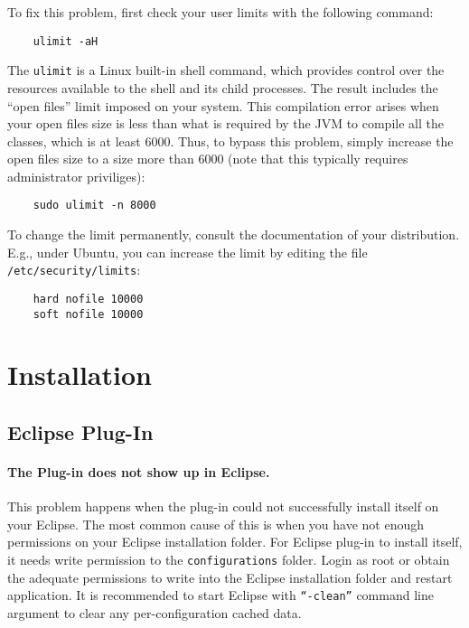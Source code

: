 \noindent To fix this problem, first check your user limits with the
following command:
\begin{verbatim}
    ulimit -aH
\end{verbatim}
The \texttt{ulimit} is a Linux built-in shell command, which provides
control over the resources available to the shell and its child
processes. The result includes the ``open files'' limit imposed on
your system. This compilation error arises when your open files
size is less than what is required by the JVM to compile all the
classes, which is at least 6000. Thus, to bypass this problem, simply
increase the open files size to a size more than 6000 (note that this
typically requires administrator priviliges):
\begin{verbatim}
    sudo ulimit -n 8000
\end{verbatim}
To change the limit permanently, consult the documentation of your
distribution. E.g., under Ubuntu, you can increase the limit by
editing the file \verb=/etc/security/limits=:
\begin{verbatim}
    hard nofile 10000
    soft nofile 10000
\end{verbatim}

\section{Installation}
\subsection{Eclipse Plug-In}
\label{trouble:eclipse_install}
\paragraph{The Plug-in does not show up in Eclipse.} This problem happens when the plug-in could not successfully install itself on your Eclipse. The most common cause of this is when you have not enough permissions on your Eclipse installation folder. For Eclipse plug-in to install itself, it needs write permission to the \texttt{configurations} folder. Login as root or obtain the adequate permissions to write into the Eclipse installation folder and restart application.
It is recommended to start Eclipse with \texttt{``-clean''} command line argument to clear any per-configuration cached data.